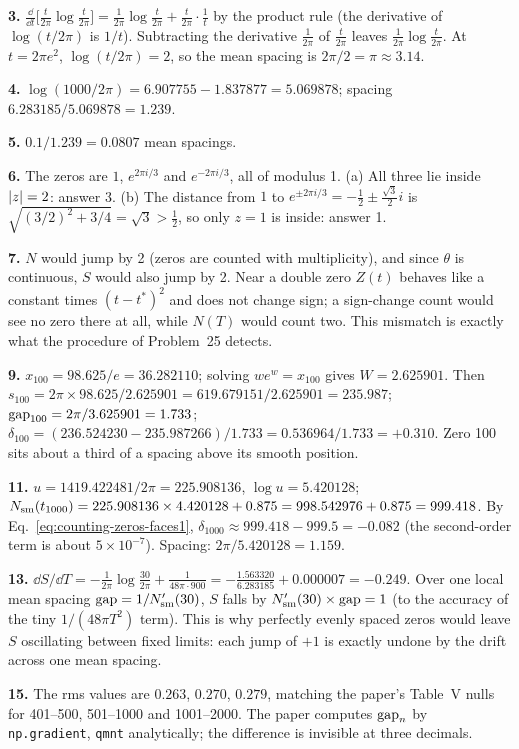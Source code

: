 \textbf{3.} $\frac{\dd}{\dd t}\bigl[\frac t{2\pi}\log\frac t{2\pi}\bigr]=\frac1{2\pi}\log\frac t{2\pi}+\frac t{2\pi}\cdot\frac1t$ by the product rule (the derivative of $\log(t/2\pi)$ is $1/t$). Subtracting the derivative $\frac1{2\pi}$ of $\frac t{2\pi}$ leaves $\frac1{2\pi}\log\frac t{2\pi}$. At $t=2\pi e^2$, $\log(t/2\pi)=2$, so the mean spacing is $2\pi/2=\pi\approx3.14$.

\textbf{4.} $\log(1000/2\pi)=6.907755-1.837877=5.069878$; spacing $6.283185/5.069878=1.239$.

\textbf{5.} $0.1/1.239=0.0807$ mean spacings.

\textbf{6.} The zeros are $1$, $e^{2\pi i/3}$ and $e^{-2\pi i/3}$, all of modulus 1. (a) All three lie inside $\left\lvert z\right\rvert=2$: answer 3. (b) The distance from $1$ to $e^{\pm2\pi i/3}=-\frac12\pm\frac{\sqrt3}2i$ is $\sqrt{(3/2)^2+3/4}=\sqrt3>\frac12$, so only $z=1$ is inside: answer 1.

\textbf{7.} $N$ would jump by 2 (zeros are counted with multiplicity), and since $\theta$ is continuous, $S$ would also jump by 2. Near a double zero $Z(t)$ behaves like a constant times $(t-t^\ast)^2$ and does not change sign; a sign-change count would see no zero there at all, while $N(T)$ would count two. This mismatch is exactly what the procedure of Problem~25 detects.

\textbf{9.} $x_{100}=98.625/e=36.282110$; solving $we^w=x_{100}$ gives $W=2.625901$. Then $s_{100}=2\pi\times98.625/2.625901=619.679151/2.625901=235.987$; $\mathrm{gap}_{100}=2\pi/3.625901=1.733$; $\delta_{100}=(236.524230-235.987266)/1.733=0.536964/1.733=+0.310$. Zero 100 sits about a third of a spacing above its smooth position.

\textbf{11.} $u=1419.422481/2\pi=225.908136$, $\log u=5.420128$; $N_{\mathrm{sm}}(t_{1000})=225.908136\times4.420128+0.875=998.542976+0.875=999.418$. By Eq.~\eqref{eq:counting-zeros-faces1}, $\delta_{1000}\approx999.418-999.5=-0.082$ (the second-order term is about $5\times10^{-7}$). Spacing: $2\pi/5.420128=1.159$.

\textbf{13.} $\dd S/\dd T=-\frac{1}{2\pi}\log\frac{30}{2\pi}+\frac{1}{48\pi\cdot900}=-\frac{1.563320}{6.283185}+0.000007=-0.249$. Over one local mean spacing $\mathrm{gap}=1/N_{\mathrm{sm}}'(30)$, $S$ falls by $N_{\mathrm{sm}}'(30)\times\mathrm{gap}=1$ (to the accuracy of the tiny $1/(48\pi T^2)$ term). This is why perfectly evenly spaced zeros would leave $S$ oscillating between fixed limits: each jump of $+1$ is exactly undone by the drift across one mean spacing.

\textbf{15.} The rms values are $0.263$, $0.270$, $0.279$, matching the paper's Table~V nulls for 401--500, 501--1000 and 1001--2000. The paper computes $\mathrm{gap}_n$ by \texttt{np.gradient}, \texttt{qmnt} analytically; the difference is invisible at three decimals.

